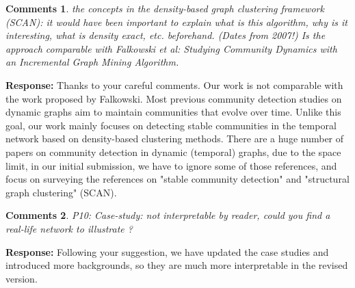 \documentclass{article}
\newtheorem{Comments}{\textbf{Comments}}
\begin{document}
\begin{Comments}
	the concepts in the density-based graph clustering framework (SCAN): it would have been important to explain what is this algorithm, why is it interesting, what is density exact, etc. beforehand. (Dates from 2007!)
	Is the approach comparable with Falkowski et al: Studying Community Dynamics with an Incremental Graph Mining Algorithm.
	
\end{Comments}
\noindent \textbf{Response: } Thanks to your careful comments. Our work is not comparable with the work proposed by Falkowski. Most previous community detection studies on dynamic graphs aim to maintain communities that evolve over time. Unlike this goal, our work mainly focuses on detecting stable communities in the temporal network based on density-based clustering methods. There are a huge number of papers on community detection in dynamic (temporal) graphs, due to the space limit, in our initial submission, we have to ignore some of those references, and focus on surveying the references on "stable community detection" and "structural graph clustering" (SCAN).


\begin{Comments}
	
	P10: Case-study: not interpretable by reader, could you find a real-life network to illustrate ?
\end{Comments}
\noindent \textbf{Response: } Following your suggestion, we have updated the case studies and introduced more backgrounds, so they are much more interpretable in the revised version.
\end{document}
